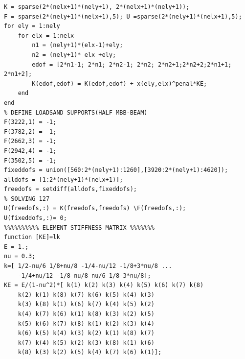 \documentclass{article}
\begin{document}
\begin{lstlisting}
K = sparse(2*(nelx+1)*(nely+1), 2*(nelx+1)*(nely+1));
F = sparse(2*(nely+1)*(nelx+1),5); U =sparse(2*(nely+1)*(nelx+1),5);
for ely = 1:nely
    for elx = 1:nelx
        n1 = (nely+1)*(elx-1)+ely;
        n2 = (nely+1)* elx +ely;
        edof = [2*n1-1; 2*n1; 2*n2-1; 2*n2; 2*n2+1;2*n2+2;2*n1+1; 2*n1+2];
        K(edof,edof) = K(edof,edof) + x(ely,elx)^penal*KE;
    end
end
% DEFINE LOADSAND SUPPORTS(HALF MBB-BEAM)
F(3222,1) = -1;
F(3782,2) = -1;
F(2662,3) = -1;
F(2942,4) = -1;
F(3502,5) = -1;
fixeddofs = union([560:2*(nely+1):1260],[3920:2*(nely+1):4620]);
alldofs = [1:2*(nely+1)*(nelx+1)];
freedofs = setdiff(alldofs,fixeddofs);
% SOLVING 127
U(freedofs,:) = K(freedofs,freedofs) \F(freedofs,:);
U(fixeddofs,:)= 0;
%%%%%%%%%% ELEMENT STIFFNESS MATRIX %%%%%%%
function [KE]=lk
E = 1.;
nu = 0.3;
k=[ 1/2-nu/6 1/8+nu/8 -1/4-nu/12 -1/8+3*nu/8 ...
    -1/4+nu/12 -1/8-nu/8 nu/6 1/8-3*nu/8];
KE = E/(1-nu^2)*[ k(1) k(2) k(3) k(4) k(5) k(6) k(7) k(8)
    k(2) k(1) k(8) k(7) k(6) k(5) k(4) k(3)
    k(3) k(8) k(1) k(6) k(7) k(4) k(5) k(2)
    k(4) k(7) k(6) k(1) k(8) k(3) k(2) k(5)
    k(5) k(6) k(7) k(8) k(1) k(2) k(3) k(4)
    k(6) k(5) k(4) k(3) k(2) k(1) k(8) k(7)
    k(7) k(4) k(5) k(2) k(3) k(8) k(1) k(6)
    k(8) k(3) k(2) k(5) k(4) k(7) k(6) k(1)];
\end{lstlisting}
\newpage
\end{document}
